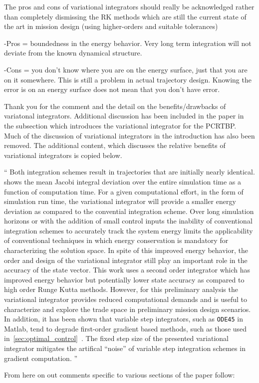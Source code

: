 \documentclass[11pt]{article}
\newenvironment{correction}{\begin{list}{}{\setlength{\leftmargin}{1cm}\setlength{\rightmargin}{1cm}}\vspace{\parsep}\item[]``}{''\end{list}}
\begin{document}
\begin{itemize}
\item 
    \begin{itshape}
The pros and cons of variational integrators should really be acknowledged rather than completely dismissing the RK methods which are still the current state of the art in mission design (using higher-orders and suitable tolerances)

-Pros = boundedness in the energy behavior.  Very long term integration will not deviate from the known dynamical structure.

-Cons = you don't know where you are on the energy surface, just that you are on it somewhere.  This is still a problem in actual trajectory design.  Knowing the error is on an energy surface does not mean that you don't have error.
\end{itshape}

Thank you for the comment and the detail on the benefits/drawbacks of variatonal integrators.
Additional discussion has been included in the paper in the subsection which introduces the variational integrator for the PCRTBP.
Much of the discussion of variational integrators in the introduction has also been removed.
The additional content, which discusses the relative benefits of variational integrators is copied below.

\begin{correction}
Both integration schemes result in trajectories that are initially nearly identical.
 shows the mean Jacobi integral deviation over the entire simulation time as a function of computation time.
For a given computational effort, in the form of simulation run time, the variational integrator will provide a smaller energy deviation as compared to the convential integration scheme.
Over long simulation horizons or with the addition of small control inputs the inability of conventional integration schemes to accurately track the system energy limits the applicability of conventional techniques in which energy conservation is mandatory for characterizing the solution space.
In spite of this improved energy behavior, the order and design of the variational integrator still play an important role in the accuracy of the state vector.
This work uses a second order integrator which has improved energy behavior but potentially lower state accuracy as compared to high order Runge Kutta methods. 
However, for this preliminary analysis the variational integrator provides reduced computational demands and is useful to characterize and explore the trade space in preliminary mission design scenarios.
In addition, it has been shown that variable step integrators, such as \texttt{ODE45} in Matlab, tend to degrade first-order gradient based methods, such as those used in~\cref{sec:optimal_control}~\cite{pellegrini2016}.
The fixed step size of the presented variational integrator mitigates the artifical ``noise'' of variable step integration schemes in gradient computation.
\end{correction}
\end{itemize}
From here on out comments specific to various sections of the paper follow:
\end{document}
